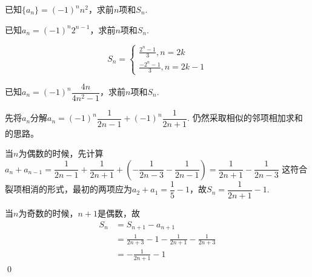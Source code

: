 \begin{exercise}
    已知\(\{a_n\}=(-1)^nn^2\)，求前\(n\)项和\(S_n\).
\end{exercise}
\begin{jie}
    
\end{jie}
\begin{exercise}
    已知\(a_n=(-1)^n 2^{n-1}\)，求前\(n\)项和\(S_n\).
\end{exercise}
\begin{jie}
    \[S_{n}=\left\{\begin{array}{l}
        \frac{2^{n}-1}{3}, n=2 k \\
        \frac{-2^{n}-1}{3}, n=2 k-1
        \end{array}\right.\]
\end{jie}
\begin{example}
    已知\(a_n=(-1)^{n} \dfrac{4 n}{4 n^{2}-1}\)，求前\(n\)项和\(S_n\).
\end{example}

\begin{jie}
    先将\(a_n\)分解\(a_{n}=(-1)^{n} \dfrac{1}{2 n-1}+(-1)^{n} \dfrac{1}{2 n+1}\).
    仍然采取相似的邻项相加求和的思路。

    当\(n\)为偶数的时候，先计算\(a_{n}+a_{n-1}=\dfrac{1}{2 n-1}+\dfrac{1}{2 n+1}+\left(-\dfrac{1}{2 n-3}-\dfrac{1}{2 n-1}\right)=\dfrac{1}{2 n+1}-\dfrac{1}{2 n-3} \)
这符合裂项相消的形式，最初的两项应为\(a_2+a_1=\dfrac{1}{5}-1\)，故\(S_n=\dfrac{1}{2n+1}-1\).

    当\(n\)为奇数的时候，\(n+1\)是偶数，故
    \begin{align*}
        S_n&=S_{n+1}-a_{n+1}\\
            &=\frac{1}{2 n+3}-1-\frac{1}{2 n+1}-\frac{1}{2 n+3}\\
            &=-\frac{1}{2 n+1}-1
    \end{align*}   
    \qed
\end{jie}


